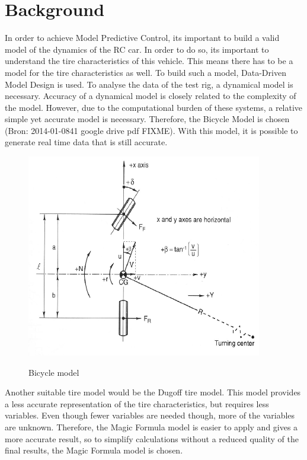 \section{Background}
In order to achieve Model Predictive Control, it\textquotesingle s important to build a valid model of the dynamics of the RC car. In order to do so, it\textquotesingle  s important to understand the tire characteristics of this vehicle. This means there has to be a model for the tire characteristics as well. To build such a model, Data-Driven Model Design is used. 
To analyse the data of the test rig, a dynamical model is necessary. Accuracy of a dynamical model is closely related to the complexity of the model. However, due to the computational burden of these systems, a relative simple yet accurate model is necessary. Therefore, the Bicycle Model is chosen (Bron: 2014-01-0841 google drive pdf FIXME). With this model, it is possible to generate real time data that is still accurate. 

\begin{figure}
	\centering
		\includegraphics[scale=0.5]{figure/bicyclemodel.png}
	\label{fig:bicyclemodel}
	\caption{Bicycle model}
\end{figure}
Another suitable tire model would be the Dugoff tire model. This model provides a less accurate representation of the tire characteristics, but requires less variables. Even though fewer variables are needed though, more of the variables are unknown. Therefore, the Magic Formula model is easier to apply and gives a more accurate result, so to simplify calculations without a reduced quality of the final results, the Magic Formula model is chosen. 

